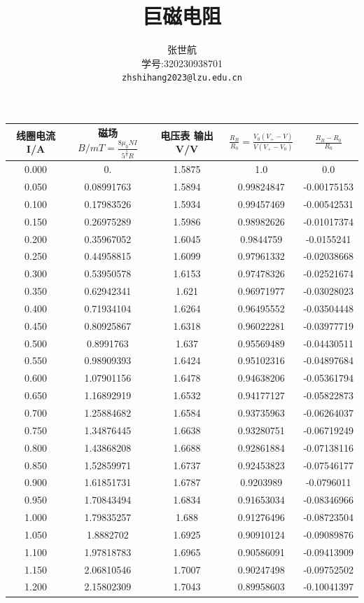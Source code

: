 \documentclass[10pt,a4paper]{article}
\author{
	张世航 \\
	学号:320230938701 \\
	\texttt{zhshihang2023@lzu.edu.cn}
}
\title{巨磁电阻}
\begin{document}
	\maketitle
	\begin{tabular}{|c|c|c|c|c|}
		\hline
		线圈电流 I/A& 磁场\(B/mT= \frac{8\mu_0 NI}{5^{\frac{3}{2}}R} \)& 电压表
		输出
		V/V & $\frac{R_B}{R_0}=\frac{V_0(V_+-V)}{V(V_+-V_0)}$ & $\frac{R_B-R_0}{R_0}$ \\
		\hline
		0.000& 0. & 1.5875 & 1.0 & 0.0 \\
		\hline
		0.050& 0.08991763 & 1.5894 & 0.99824847 & -0.00175153 \\
		\hline
		0.100& 0.17983526 & 1.5934 & 0.99457469 & -0.00542531 \\
		\hline
		0.150& 0.26975289 & 1.5986 & 0.98982626 & -0.01017374 \\
		\hline
		0.200& 0.35967052 & 1.6045 & 0.9844759 & -0.0155241 \\
		\hline
		0.250& 0.44958815 & 1.6099 & 0.97961332 & -0.02038668 \\
		\hline
		0.300& 0.53950578 & 1.6153 & 0.97478326 & -0.02521674 \\
		\hline
		0.350& 0.62942341 & 1.621 & 0.96971977 & -0.03028023 \\
		\hline
		0.400& 0.71934104 & 1.6264 & 0.96495552 & -0.03504448 \\
		\hline
		0.450& 0.80925867 & 1.6318 & 0.96022281 & -0.03977719 \\
		\hline
		0.500& 0.8991763 & 1.637 & 0.95569489 & -0.04430511 \\
		\hline
		0.550& 0.98909393 & 1.6424 & 0.95102316 & -0.04897684 \\
		\hline
		0.600& 1.07901156 & 1.6478 & 0.94638206 & -0.05361794 \\
		\hline
		0.650& 1.16892919 & 1.6532 & 0.94177127 & -0.05822873 \\
		\hline
		0.700& 1.25884682 & 1.6584 & 0.93735963 & -0.06264037 \\
		\hline
		0.750& 1.34876445 & 1.6638 & 0.93280751 & -0.06719249 \\
		\hline
		0.800& 1.43868208 & 1.6688 & 0.92861884 & -0.07138116 \\
		\hline
		0.850& 1.52859971 & 1.6737 & 0.92453823 & -0.07546177 \\
		\hline
		0.900& 1.61851731 & 1.6787 & 0.9203989 & -0.0796011 \\
		\hline
		0.950& 1.70843494 & 1.6834 & 0.91653034 & -0.08346966 \\
		\hline
		1.000& 1.79835257 & 1.688 & 0.91276496 & -0.08723504 \\
		\hline
		1.050& 1.8882702 & 1.6925 & 0.90910124 & -0.09089876 \\
		\hline
		1.100& 1.97818783 & 1.6965 & 0.90586091 & -0.09413909 \\
		\hline
		1.150& 2.06810546 & 1.7007 & 0.90247498 & -0.09752502 \\
		\hline
		1.200& 2.15802309 & 1.7043 & 0.89958603 & -0.10041397 \\
		\hline
	\end{tabular}
\end{document}
